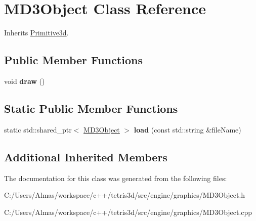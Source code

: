 \hypertarget{class_m_d3_object}{\section{M\-D3\-Object Class Reference}
\label{class_m_d3_object}
}


Inherits \hyperlink{class_primitive3d}{Primitive3d}.

\subsection*{Public Member Functions}
\begin{DoxyCompactItemize}
\item 
\hypertarget{class_m_d3_object_ae116275d73621009c6401ba8ce2585e1}{void {\bfseries draw} ()}\label{class_m_d3_object_ae116275d73621009c6401ba8ce2585e1}

\end{DoxyCompactItemize}
\subsection*{Static Public Member Functions}
\begin{DoxyCompactItemize}
\item 
\hypertarget{class_m_d3_object_ad41bf4bc7fb2e1436064904a84117c79}{static std\-::shared\-\_\-ptr$<$ \hyperlink{class_m_d3_object}{M\-D3\-Object} $>$ {\bfseries load} (const std\-::string \&file\-Name)}\label{class_m_d3_object_ad41bf4bc7fb2e1436064904a84117c79}

\end{DoxyCompactItemize}
\subsection*{Additional Inherited Members}


The documentation for this class was generated from the following files\-:\begin{DoxyCompactItemize}
\item 
C\-:/\-Users/\-Almas/workspace/c++/tetris3d/src/engine/graphics/M\-D3\-Object.\-h\item 
C\-:/\-Users/\-Almas/workspace/c++/tetris3d/src/engine/graphics/M\-D3\-Object.\-cpp\end{DoxyCompactItemize}
